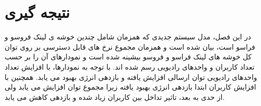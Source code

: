 \section{نتیجه گیری}
در این فصل، مدل سیستم جدیدی که همزمان شامل چندین خوشه ی لینک فروسو و فراسو است، بیان شده است و همزمان مجموع نرخ های قابل دسترسی بر روی توان کل خوشه های لینک فراسو و فروسو بیشینه شده است و نمودارهای آن را بر حسب تعداد کاربران و واحدهای رادیویی رسم شده اند. با توجه به نمودارها، با افزایش تعداد واحدهای رادیویی توان ارسالی افزایش یافته و بازدهی انرژی بهبود می یابد.  همچنین با افزایش کاربران ابتدا بازدهی انرژی بهبود یافته زیرا مجموع توان افزایش می یابد ولی از حدی به بعد، تاثیر تداخل بین کاربران زیاد شده و بازدهی کاهش می یابد.
